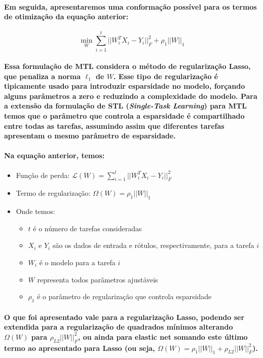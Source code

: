 \documentclass[a4paper]{article}    %
\begin{document}
\paragraph{Em seguida, apresentaremos uma conformação possível para os termos de otimização da equação anterior:}

\[\min_W \sum_{i=1}^{t} ||W_i^T X_i - Y_i||_F^2 + \rho_1||W||_1\]

\paragraph{Essa formulação de MTL considera o método de regularização Lasso, que penaliza a norma $\ell_1$ de $W$. Esse tipo de regularização é tipicamente usado para introduzir esparsidade no modelo, forçando alguns parâmetros a zero e reduzindo a complexidade do modelo. Para a extensão da formulação de STL (\emph{Single-Task Learning}) para MTL temos que o parâmetro que controla a esparsidade é compartilhado entre todas as tarefas, assumindo assim que diferentes tarefas apresentam o mesmo parâmetro de esparsidade.}

\paragraph{Na equação anterior, temos:}
\begin{itemize}
    \item Função de perda: $\mathcal{L}(W) = \sum_{i=1}^{t} ||W_i^T X_i - Y_i||_F^2$
    \item Termo de regularização: $\Omega(W) = \rho_1||W||_1$
    \item Onde temos:
    \begin{itemize}
        \item $t$ é o número de tarefas consideradas
        \item $X_i$ e $Y_i$ são os dados de entrada e rótulos, respectivamente, para a tarefa $i$
        \item $W_i$ é o modelo para a tarefa $i$
        \item $W$ representa todos parâmetros ajustáveis
        \item $\rho_1$ é o parâmetro de regularização que controla esparsidade
    \end{itemize}
\end{itemize}

\paragraph{O que foi apresentado vale para a regularização Lasso, podendo ser extendida para a regularização de quadrados mínimos alterando $\Omega(W)$ para $\rho_{L2}||W||_F^2$, ou ainda para elastic net somando este último termo ao apresentado para Lasso (ou seja, $\Omega(W) = \rho_1 ||W||_1 + \rho_{L2}||W||_F^2$).}
\end{document}
